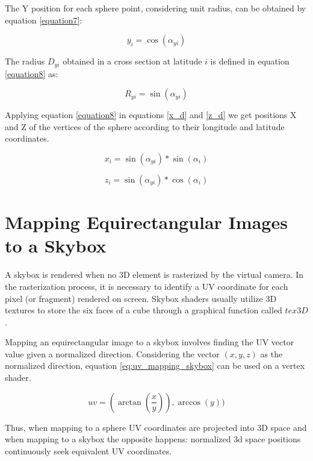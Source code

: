 \documentclass[12pt]{article}
\begin{document}
The Y position for each sphere point, considering unit radius, can be obtained by equation \ref{equation7}:

\begin{equation}
y_{i} = \cos(\alpha_{yi})
\label{equation7}
\end{equation}

The radius $D_{yi}$ obtained in a cross section at latitude $i$ is defined in equation \ref{equation8} as:

\begin{equation}
R_{yi} = \sin(\alpha_{yi})
\label{equation8}
\end{equation}

Applying equation \ref{equation8} in equations \ref{x_d} and \ref{z_d} we get  positions X and Z of the vertices of the sphere according to their longitude and latitude coordinates.

\begin{equation}
x_{i} = \sin(\alpha_{yi}) * \sin(\alpha_i)
\label{equation9}
\end{equation}

\begin{equation}
z_{i} = \sin(\alpha_{yi}) * \cos(\alpha_i)
\label{equation10}
\end{equation}

\section{Mapping Equirectangular Images to a Skybox}
A skybox is rendered when no 3D element is rasterized by the virtual camera. In the rasterization process, it is necessary to identify a UV coordinate for each pixel (or fragment) rendered on screen. Skybox shaders usually utilize 3D textures to store the six faces of a cube through a graphical function called $tex3D$.

Mapping an equirectangular image to a skybox involves finding the UV vector value given a normalized direction. Considering the vector $(x, y, z)$ as the normalized direction, equation \ref{eq:uv_mapping_skybox} can be used on a vertex shader.

\begin{equation}
uv = (\arctan(\frac{x}{y})), \arccos(y))
\label{eq:uv_mapping_skybox}
\end{equation}

Thus, when mapping to a sphere UV coordinates are projected into 3D space and when mapping to a skybox the opposite happens: normalized 3d space positions continuously seek equivalent UV coordinates.
\end{document}
